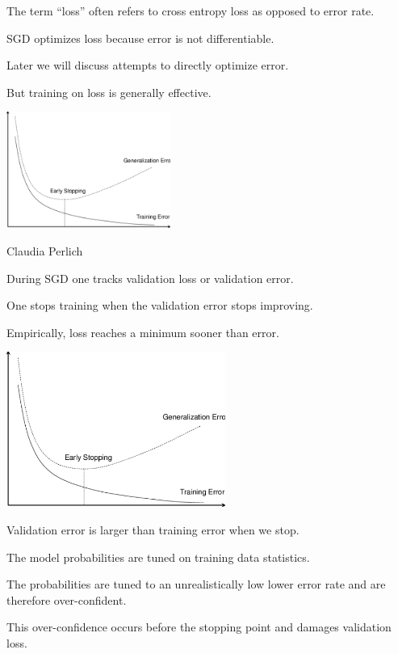 {\vfill
The term ``loss'' often refers to cross entropy loss as opposed to error rate.

\vfill
SGD optimizes loss because error is not differentiable.

\vfill
Later we will discuss attempts to directly optimize error.

\vfill
But training on loss is generally effective.



\centerline{\includegraphics[height = 1.5in]{../images/Early}}

\centerline{\huge Claudia Perlich}

\vfill
During SGD one tracks validation loss or validation error.

\vfill
One stops training when the validation error stops improving.

\vfill
Empirically, loss reaches a minimum sooner than error.


\centerline{\includegraphics[height = 2in]{../images/Early}}

\vfill
Validation error is larger than training error when we stop.

\vfill
The model probabilities are tuned on training data statistics.

\vfill
The probabilities are tuned to an unrealistically low lower error rate and are therefore over-confident.

\vfill
This over-confidence occurs before the stopping point and damages validation loss.


}

